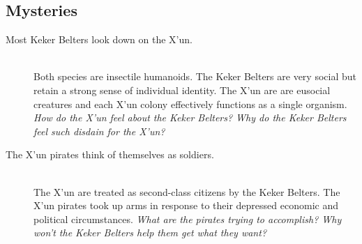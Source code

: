 \documentclass[11pt, a5paper, parskip=half-, DIV=12]{scrartcl}
\begin{document}
\subsection*{Mysteries}
\begin{description}
	\item[Most Keker Belters look down on the X'un.] \phantom{a} \\ Both species are insectile humanoids. The Keker Belters are very social but retain a strong sense of individual identity. The X'un are are eusocial creatures and each X'un colony effectively functions as a single organism. \textit{How do the X'un feel about the Keker Belters? Why do the Keker Belters feel such disdain for the X'un? }
	\item[The X'un pirates think of themselves as soldiers.] \phantom{a} \\ The X'un are treated as second-class citizens by the Keker Belters. The X'un pirates took up arms in response to their depressed economic and political circumstances. \textit{What are the pirates trying to accomplish? Why won't the Keker Belters help them get what they want? }
\end{description}
\end{document}
